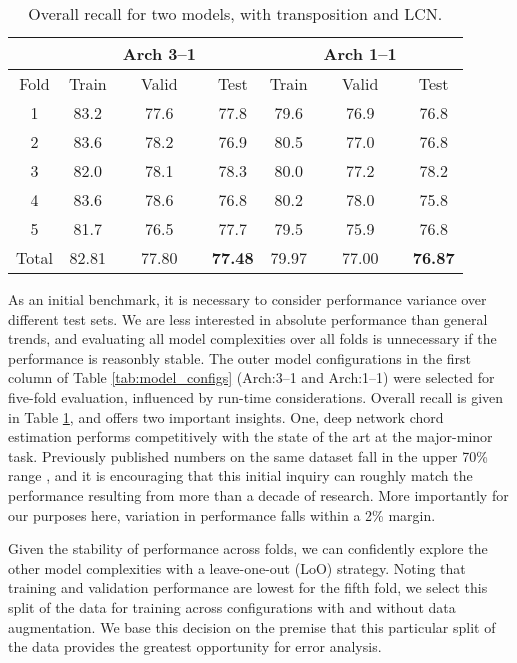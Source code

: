 \begin{table}[!t]
\caption{Overall recall for two models, with transposition and LCN.}
\label{table:exp1res}
\centering
\begin{tabular}{c || c c c || c c c |}
 & & Arch 3--1 & & & Arch 1--1 & \\
 \hline
Fold & Train & Valid & Test & Train & Valid & Test \\
\hline
1 & 83.2 & 77.6 & 77.8 &  79.6 & 76.9 & 76.8 \\
2 & 83.6 & 78.2 & 76.9 & 80.5 & 77.0 & 76.8 \\
3 & 82.0 & 78.1 & 78.3 & 80.0 & 77.2 & 78.2\\
4 & 83.6 & 78.6 & 76.8 & 80.2 & 78.0 & 75.8 \\
5 & 81.7 & 76.5 & 77.7 & 79.5 & 75.9 & 76.8 \\
\hline
Total &  82.81 & 77.80 & \textbf{77.48} & 79.97 & 77.00 & \textbf{76.87}\\
\hline
\end{tabular}
\end{table}

As an initial benchmark, it is necessary to consider performance variance over different test sets.
We are less interested in absolute performance than general trends, and evaluating all model complexities over all folds is unnecessary if the performance is reasonbly stable.
The outer model configurations in the first column of Table \ref{tab:model_configs} (Arch:3--1 and Arch:1--1) were selected for five-fold evaluation, influenced by run-time considerations.
Overall recall is given in Table \ref{table:exp1res}, and offers two important insights.
One, deep network chord estimation performs competitively with the state of the art at the major-minor task.
Previously published numbers on the same dataset fall in the upper 70\% range \cite{Cho2011}, and it is encouraging that this initial inquiry can roughly match the performance resulting from more than a decade of research.
More importantly for our purposes here, variation in performance falls within a 2\% margin.

Given the stability of performance across folds, we can confidently explore the other model complexities with a leave-one-out (LoO) strategy.
Noting that training and validation performance are lowest for the fifth fold, we select this split of the data for training across configurations with and without data augmentation.
We base this decision on the premise that this particular split of the data provides the greatest opportunity for error analysis.

